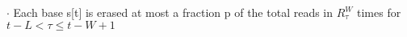 \documentclass[preview]{standalone}
\begin{document}
\begin{center}
$\cdot$ Each base s[t] is erased at most a fraction p of the total reads in $R^W_{\tau}$ times for $t-L < \tau \le t-W+1$
\end{center}
\end{document}
